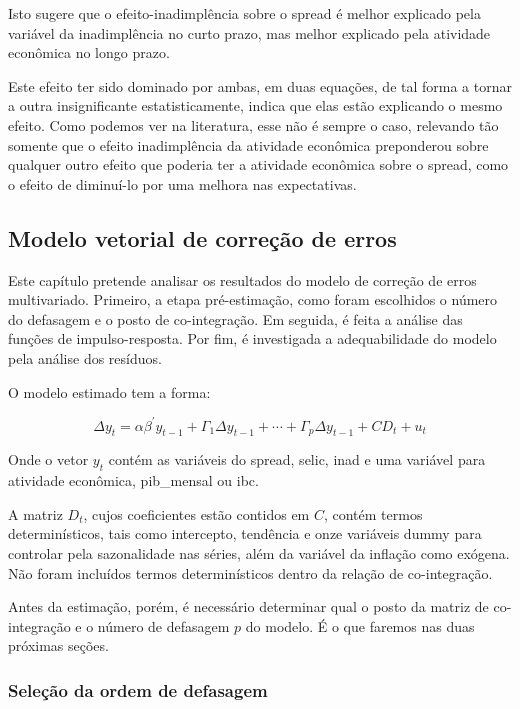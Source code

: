 \documentclass[a4paper,
               article,
               12pt,
               openany,
               oneside,
               english,
               brazil]{abntex2}
\numberwithin{equation}{section}
\begin{document}
    Isto sugere que o efeito-inadimplência sobre o spread é melhor explicado pela variável da inadimplência no curto prazo, mas melhor explicado pela atividade econômica no longo prazo.
    
    Este efeito ter sido dominado por ambas, em duas equações, de tal forma a tornar a outra insignificante estatisticamente, indica que elas estão explicando o mesmo efeito. Como podemos ver na literatura, esse não é sempre o caso, relevando tão somente que o efeito inadimplência da atividade econômica preponderou sobre qualquer outro efeito que poderia ter a atividade econômica sobre o spread, como o efeito de diminuí-lo por uma melhora nas expectativas.

    \subsection{Modelo vetorial de correção de erros}

    Este capítulo pretende analisar os resultados do modelo de correção de erros multivariado. Primeiro, a etapa pré-estimação, como foram escolhidos o número do defasagem e o posto de co-integração. Em seguida, é feita a análise das funções de impulso-resposta. Por fim, é investigada a adequabilidade do modelo pela análise dos resíduos.

    O modelo estimado tem a forma:

    \begin{equation}
        \Delta y_t = \alpha \beta^{'} y_{t-1}+ \Gamma_1 \Delta y_{t-1} + \cdots + \Gamma_{p} \Delta y_{t-1} + CD_t + u_t \label{vecm_spread}
    \end{equation}

    Onde o vetor $ y_t $ contém as variáveis do spread, selic, inad e uma variável para atividade econômica, pib\_mensal ou ibc.
    
    A matriz $ D_t $, cujos coeficientes estão contidos em $ C $, contém termos determinísticos, tais como intercepto, tendência e onze variáveis dummy para controlar pela sazonalidade nas séries, além da variável da inflação como exógena. Não foram incluídos termos determinísticos dentro da relação de co-integração.

    Antes da estimação, porém, é necessário determinar qual o posto da matriz de co-integração e o número de defasagem $ p $ do modelo. É o que faremos nas duas próximas seções.

    \subsubsection{Seleção da ordem de defasagem}
\end{document}
